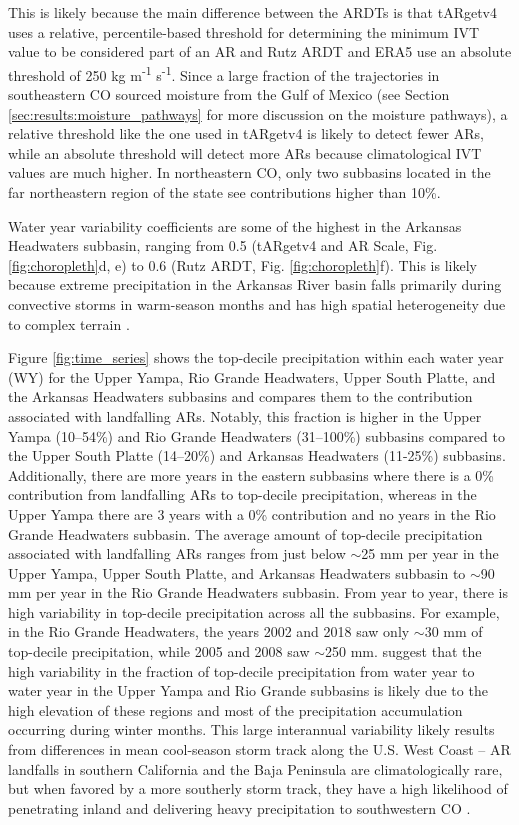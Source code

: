 \documentclass[draft]{agujournal2019}
\begin{document}
This is likely because the main difference between the ARDTs is that tARgetv4 uses a relative, percentile-based threshold for determining the minimum IVT value to be considered part of an AR and Rutz ARDT and ERA5 use an absolute threshold of 250 kg m\textsuperscript{-1} s\textsuperscript{-1}. Since a large fraction of the trajectories in southeastern CO sourced moisture from the Gulf of Mexico (see Section \ref{sec:results:moisture_pathways} for more discussion on the moisture pathways), a relative threshold like the one used in tARgetv4 is likely to detect fewer ARs, while an absolute threshold will detect more ARs because climatological IVT values are much higher. In northeastern CO, only two subbasins located in the far northeastern region of the state see contributions higher than 10\%. 

Water year variability coefficients are some of the highest in the Arkansas Headwaters subbasin, ranging from 0.5 (tARgetv4 and AR Scale, Fig. \ref{fig:choropleth}d, e) to 0.6 (Rutz ARDT, Fig. \ref{fig:choropleth}f). This is likely because extreme precipitation in the Arkansas River basin falls primarily during convective storms in warm-season months and has high spatial heterogeneity due to complex terrain \cite{Javier2007ClimatologyBasin}.

Figure \ref{fig:time_series} shows the top-decile precipitation within each water year (WY) for the Upper Yampa, Rio Grande Headwaters, Upper South Platte, and the Arkansas Headwaters subbasins and compares them to the contribution associated with landfalling ARs. Notably, this fraction is higher in the Upper Yampa (10--54\%) and Rio Grande Headwaters (31--100\%) subbasins compared to the Upper South Platte (14--20\%) and Arkansas Headwaters (11-25\%) subbasins. Additionally, there are more years in the eastern subbasins where there is a 0\% contribution from landfalling ARs to top-decile precipitation, whereas in the Upper Yampa there are 3 years with a 0\% contribution and no years in the Rio Grande Headwaters subbasin. The average amount of top-decile precipitation associated with landfalling ARs ranges from just below  $\sim$25 mm per year in the Upper Yampa, Upper South Platte, and Arkansas Headwaters subbasin to $\sim$90 mm per year in the Rio Grande Headwaters subbasin. From year to year, there is high variability in top-decile precipitation across all the subbasins. For example, in the Rio Grande Headwaters, the years 2002 and 2018 saw only  $\sim$30 mm of top-decile precipitation, while 2005 and 2008 saw  $\sim$250 mm.  suggest that the high variability in the fraction of top-decile precipitation from water year to water year in the Upper Yampa and Rio Grande subbasins is likely due to the high elevation of these regions and most of the precipitation accumulation occurring during winter months. This large interannual variability likely results from differences in mean cool-season storm track along the U.S. West Coast – AR landfalls in southern California and the Baja Peninsula are climatologically rare, but when favored by a more southerly storm track, they have a high likelihood of penetrating inland and delivering heavy precipitation to southwestern CO \cite{Rutz2014, Rutz2015}.
\end{document}
